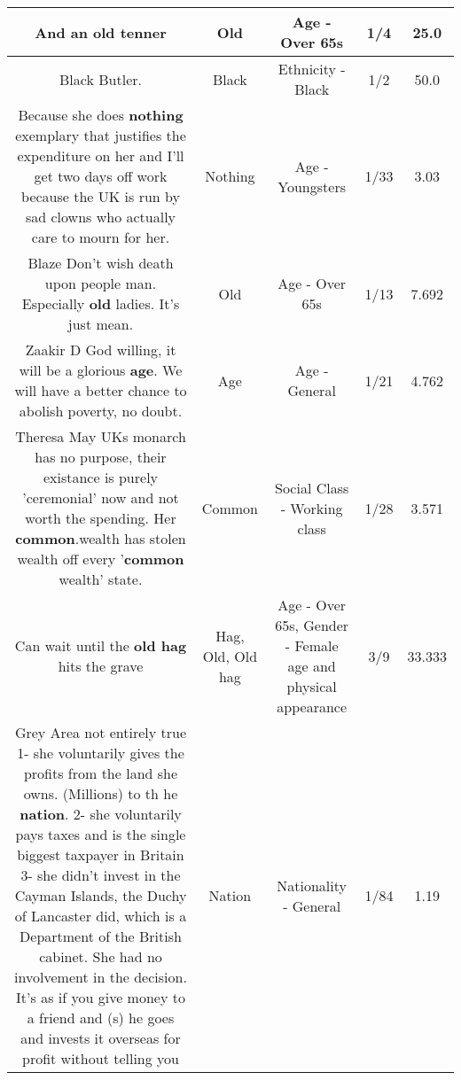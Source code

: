 \documentclass[11pt]{article}
\newlength\mylength
\begin{document}
\begin{center}
\begin{longtable}{|C{.65\mylength}|C{.30\mylength}|C{.12\mylength}|C{.12\mylength}|C{.12\mylength}|}
  \small And an \textbf{old} tenner\normalsize   & Old & Age - Over 65s & 1/4 & 25.0 \\  \hline
  \small Black Butler.\normalsize   & Black & Ethnicity - Black & 1/2 & 50.0 \\  \hline
  \small Because she does \textbf{nothing} exemplary that justifies the expenditure on her and I'll get two days off work because the UK is run by sad clowns who actually care to mourn for her.\normalsize   & Nothing & Age - Youngsters & 1/33 & 3.03 \\  \hline
  \small Blaze Don't wish death upon people man. Especially \textbf{old} ladies. It's just mean.\normalsize   & Old & Age - Over 65s & 1/13 & 7.692 \\  \hline
  \small Zaakir D God willing, it will be a glorious \textbf{age}. We will have a better chance to abolish poverty, no doubt.\normalsize   & Age & Age - General & 1/21 & 4.762 \\  \hline
  \small Theresa May UKs monarch has no purpose, their existance is purely 'ceremonial' now and not worth the spending. Her \textbf{common}.wealth has stolen wealth off every '\textbf{common} wealth' state.\normalsize   & Common & Social Class - Working class & 1/28 & 3.571 \\  \hline
  \small Can wait until the \textbf{o\textbf{ld} h\textbf{ag}} hits the grave\normalsize   & Hag, Old, Old hag & Age - Over 65s, Gender - Female age and physical appearance & 3/9 & 33.333 \\  \hline
  \small Grey Area not entirely true 1- she voluntarily gives the profits from the land she owns. (Millions) to th he \textbf{nation}. 2- she voluntarily pays taxes and is the single biggest taxpayer in Britain 3- she didn't invest in the Cayman Islands, the Duchy of Lancaster did, which is a Department of the British cabinet. She had no involvement in the decision. It's as if you give money to a friend and (s) he goes and invests it overseas for profit without telling you\normalsize   & Nation & Nationality - General & 1/84 & 1.19 \\  \hline

\end{longtable}
\end{center}
\end{document}
